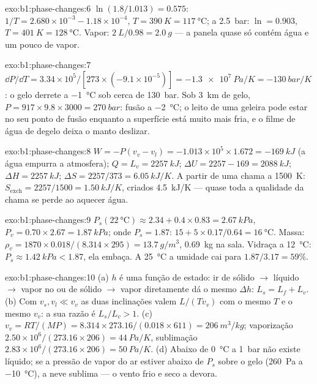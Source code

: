 \begin{solution}{exo:b1:phase-changes:6}
$\ln(1.8/1.013) = 0.575$: $1/T = 2.680 \times 10^{-3} - 1.18 \times 10^{-4}$,
$T = \qty{390}{K} = \qty{117}{\degreeCelsius}$; a \qty{2.5}{bar}: $\ln = 0.903$,
$T = \qty{401}{K} = \qty{128}{\degreeCelsius}$. Vapor: $\qty{2}{L}/0.98 =
\qty{2.0}{g}$ --- a panela quase só contém água e um pouco de
vapor.
\end{solution}

\begin{solution}{exo:b1:phase-changes:7}
$\dd P/\dd T = 3.34 \times 10^5/[273 \times (-9.1 \times 10^{-5})] = \qty{-1.3e7}{Pa/K}
= \qty{-130}{bar/K}$: o gelo derrete a \qty{-1}{\degreeCelsius} sob cerca de
\qty{130}{bar}. Sob \qty{3}{km} de gelo, $P = 917 \times 9.8 \times 3000 =
\qty{270}{bar}$: fusão a \qty{-2}{\degreeCelsius}; o leito de uma geleira pode estar
no seu ponto de fusão enquanto a superfície está muito mais fria, e o filme de
água de degelo deixa o manto deslizar.
\end{solution}

\begin{solution}{exo:b1:phase-changes:8}
$W = -P(v_v - v_l) = -1.013 \times 10^5 \times 1.672 = \qty{-169}{kJ}$ (a água
empurra a atmosfera); $Q = L_v = \qty{2257}{kJ}$; $\Delta U = 2257 - 169
= \qty{2088}{kJ}$; $\Delta H = \qty{2257}{kJ}$; $\Delta S = 2257/373 = \qty{6.05}{kJ/K}$.
A partir de uma chama a \qty{1500}{K}: $S_{\mathrm{exch}} = 2257/1500 = \qty{1.50}{kJ/K}$,
criados \qty{4.5}{kJ/K} --- quase toda a qualidade da chama se perde ao aquecer
água.
\end{solution}

\begin{solution}{exo:b1:phase-changes:9}
$P_s(\qty{22}{\degreeCelsius}) \approx 2.34 + 0.4 \times 0.83 = \qty{2.67}{kPa}$,
$P_v = 0.70 \times 2.67 = \qty{1.87}{kPa}$;  onde $P_s = 1.87$: $15 +
5 \times 0.17/0.64 = \qty{16}{\degreeCelsius}$. Massa: $\rho_v = 1870 \times 0.018/
(8.314 \times 295) = \qty{13.7}{g/m^3}$, \qty{0.69}{kg} na sala. Vidraça a
\qty{12}{\degreeCelsius}: $P_s \approx \qty{1.42}{kPa} < 1.87$, ela embaça. A
\qty{25}{\degreeCelsius} a umidade cai para $1.87/3.17 = 59\%$.
\end{solution}

\begin{solution}{exo:b1:phase-changes:10}
(a) $h$ é uma função de estado: ir de sólido $\to$ líquido $\to$ vapor no
 ou de sólido $\to$ vapor diretamente dá o mesmo $\Delta h$:
$L_s = L_f + L_v$. (b) Com $v_s, v_l \ll v_v$ as duas inclinações valem $L/(Tv_v)$ com
o mesmo $T$ e o mesmo $v_v$: a sua razão é $L_s/L_v > 1$. (c) $v_v = RT/(MP) =
8.314 \times 273.16/(0.018 \times 611) = \qty{206}{m^3/kg}$; vaporização
$2.50 \times 10^6/(273.16 \times 206) = \qty{44}{Pa/K}$, sublimação $2.83 \times 10^6/
(273.16 \times 206) = \qty{50}{Pa/K}$. (d) Abaixo de \qty{0}{\degreeCelsius} a
\qty{1}{bar} não existe líquido; se a pressão de vapor do ar estiver abaixo de
$P_s$ sobre o gelo (\qty{260}{Pa} a \qty{-10}{\degreeCelsius}), a neve
sublima --- o vento frio e seco a devora.
\end{solution}

